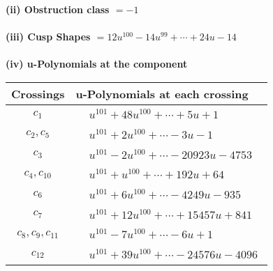 \documentclass[1p]{elsarticle_modified}
\theoremstyle{definition}
\begin{document}
\flushleft \textbf{(ii) Obstruction class $= -1$}\\~\\
\flushleft \textbf{(iii) Cusp Shapes $= 12 u^{100}-14 u^{99}+\cdots+24 u-14$}\\~\\
\newpage\renewcommand{\arraystretch}{1}
\flushleft \textbf{(iv) u-Polynomials at the component}\newline \\
\begin{tabular}{m{50pt}|m{274pt}}
Crossings & \hspace{64pt}u-Polynomials at each crossing \\
\hline $$\begin{aligned}c_{1}\end{aligned}$$&$\begin{aligned}
&u^{101}+48 u^{100}+\cdots+5 u+1
\end{aligned}$\\
\hline $$\begin{aligned}c_{2},c_{5}\end{aligned}$$&$\begin{aligned}
&u^{101}+2 u^{100}+\cdots-3 u-1
\end{aligned}$\\
\hline $$\begin{aligned}c_{3}\end{aligned}$$&$\begin{aligned}
&u^{101}-2 u^{100}+\cdots-20923 u-4753
\end{aligned}$\\
\hline $$\begin{aligned}c_{4},c_{10}\end{aligned}$$&$\begin{aligned}
&u^{101}+u^{100}+\cdots+192 u+64
\end{aligned}$\\
\hline $$\begin{aligned}c_{6}\end{aligned}$$&$\begin{aligned}
&u^{101}+6 u^{100}+\cdots-4249 u-935
\end{aligned}$\\
\hline $$\begin{aligned}c_{7}\end{aligned}$$&$\begin{aligned}
&u^{101}+12 u^{100}+\cdots+15457 u+841
\end{aligned}$\\
\hline $$\begin{aligned}c_{8},c_{9},c_{11}\end{aligned}$$&$\begin{aligned}
&u^{101}-7 u^{100}+\cdots-6 u+1
\end{aligned}$\\
\hline $$\begin{aligned}c_{12}\end{aligned}$$&$\begin{aligned}
&u^{101}+39 u^{100}+\cdots-24576 u-4096
\end{aligned}$\\
\hline
\end{tabular}\\~\\
\end{document}
